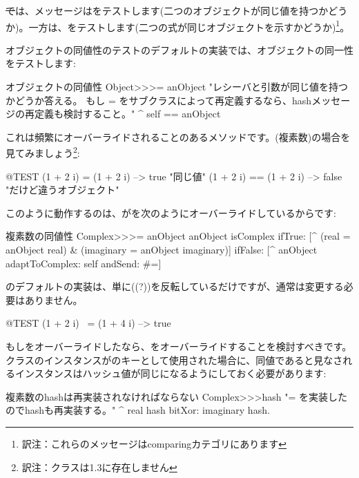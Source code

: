 \documentclass[a4paper,10pt,twoside]{book}
\begin{document}
\st では、\ct{=}メッセージはをテストします(\ie 二つのオブジェクトが同じ値を持つかどうか)。一方\ct{==}は、をテストします(\ie 二つの式が同じオブジェクトを示すかどうか)\footnote{訳注：これらのメッセージはcomparingカテゴリにあります}。

オブジェクトの同値性のテストのデフォルトの実装では、オブジェクトの同一性をテストします:
\begin{method}{オブジェクトの同値性}
Object>>>= anObject
    "レシーバと引数が同じ値を持つかどうか答える。
    もし = をサブクラスによって再定義するなら、hashメッセージの再定義も検討すること。"
    ^ self == anObject
\end{method}

これは頻繁にオーバーライドされることのあるメソッドです。(複素数)の場合を見てみましょう\footnote{訳注：クラスは\pharo 1.3に存在しません}:

\begin{code}{@TEST}
(1 + 2 i) = (1 + 2 i)   --> true     "同じ値"
(1 + 2 i) == (1 + 2 i) --> false    "だけど違うオブジェクト"
\end{code}

このように動作するのは、が\ct{=}を次のようにオーバーライドしているからです:
\begin{method}{複素数の同値性}
Complex>>>= anObject
    anObject isComplex
        ifTrue: [^ (real = anObject real) & (imaginary = anObject imaginary)]
        ifFalse: [^ anObject adaptToComplex: self andSend: #=]
\end{method}

のデフォルトの実装は、単に((?\ct{=}))を反転しているだけですが、通常は変更する必要はありません。

\begin{code}{@TEST}
(1 + 2 i) ~= (1 + 4 i) --> true
\end{code}

もし\ct{=}をオーバーライドしたなら、をオーバーライドすることを検討すべきです。クラスのインスタンスがのキーとして使用された場合に、同値であると見なされるインスタンスはハッシュ値が同じになるようにしておく必要があります:
\begin{method}{複素数のhashは再実装されなければならない}
Complex>>>hash
    "= を実装したのでhashも再実装する。"
    ^ real hash bitXor: imaginary hash.
\end{method}
\end{document}
